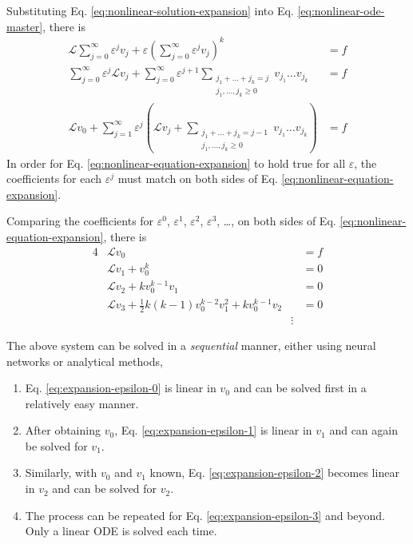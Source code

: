 \documentclass{article}
\renewcommand{\L}{\mathcal{L}}
\begin{document}
    Substituting Eq. \ref{eq:nonlinear-solution-expansion} into Eq. \ref{eq:nonlinear-ode-master}, there is
    \begin{align}
        \L \sum_{j=0}^{\infty} \varepsilon^j v_j + \varepsilon \left(\sum_{j=0}^{\infty} \varepsilon^j v_j\right)^k &= f \\
        \sum_{j=0}^{\infty} \varepsilon^j \L v_j + \sum_{j=0}^{\infty} \varepsilon^{j+1} \sum_{\substack{j_1+\dots+j_k = j\\j_1, \dots, j_k \geq 0}}v_{j_1}\dots v_{j_k} &= f \\ 
        \L v_0 + \sum_{j=1}^{\infty} \varepsilon^j \left(\L v_j + \sum_{\substack{j_1+\dots+j_k = j - 1\\j_1, \dots, j_k \geq 0}}v_{j_1}\dots v_{j_k}\right)&= f \label{eq:nonlinear-equation-expansion} 
    \end{align}
    In order for Eq. \ref{eq:nonlinear-equation-expansion} to hold true for all $\varepsilon$, the coefficients for each $\varepsilon^j$ must match on both sides of Eq. \ref{eq:nonlinear-equation-expansion}.

    Comparing the coefficients for $\varepsilon^0$, $\varepsilon^1$, $\varepsilon^2$, $\varepsilon^3$, \dots, on both sides of Eq. \ref{eq:nonlinear-equation-expansion}, there is
    \begin{alignat}{4}
        &\L v_0 &&= f \label{eq:expansion-epsilon-0}\\
        &\L v_1 + v_0^k &&= 0 \label{eq:expansion-epsilon-1}\\
        &\L v_2 + k v_0^{k-1}v_1 &&= 0 \label{eq:expansion-epsilon-2} \\
        &\L v_3 + \frac{1}{2}k(k-1)v_0^{k-2}v_1^2 + k v_0^{k-1}v_2 &&= 0 \label{eq:expansion-epsilon-3}\\
        &&\vdots &\nonumber
    \end{alignat}

    The above system can be solved in a \textit{sequential} manner, either using neural networks or analytical methods,
    \begin{enumerate}
        \item Eq. \ref{eq:expansion-epsilon-0} is linear in $v_0$ and can be solved first in a relatively easy manner. 
        \item After obtaining $v_0$, Eq. \ref{eq:expansion-epsilon-1} is linear in $v_1$ and can again be solved for $v_1$. 
        \item Similarly, with $v_0$ and $v_1$ known, Eq. \ref{eq:expansion-epsilon-2} becomes linear in $v_2$ and can be solved for $v_2$.
        \item The process can be repeated for Eq. \ref{eq:expansion-epsilon-3} and beyond. Only a linear ODE is solved each time.
    \end{enumerate}
\end{document}
